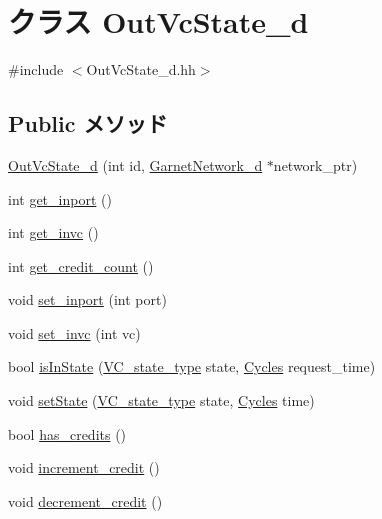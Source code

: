 \hypertarget{classOutVcState__d}{
\section{クラス OutVcState\_\-d}
\label{classOutVcState__d}
}


{\ttfamily \#include $<$OutVcState\_\-d.hh$>$}\subsection*{Public メソッド}
\begin{DoxyCompactItemize}
\item 
\hyperlink{classOutVcState__d_ad33dd53fd18c50a60742ba79d00c0aa3}{OutVcState\_\-d} (int id, \hyperlink{classGarnetNetwork__d}{GarnetNetwork\_\-d} $\ast$network\_\-ptr)
\item 
int \hyperlink{classOutVcState__d_aca4f0a0f6de31068eeef5a6a9ac277e1}{get\_\-inport} ()
\item 
int \hyperlink{classOutVcState__d_a37edb28b7e396bbc7599b01bc7a1fbbd}{get\_\-invc} ()
\item 
int \hyperlink{classOutVcState__d_a7887491ea82ae294ea3047f854f44490}{get\_\-credit\_\-count} ()
\item 
void \hyperlink{classOutVcState__d_ae97206c3cb5b279e0450ec99e6621fb6}{set\_\-inport} (int port)
\item 
void \hyperlink{classOutVcState__d_af2d22add988a75ebb297580c3e1d8df2}{set\_\-invc} (int vc)
\item 
bool \hyperlink{classOutVcState__d_ac76622b1411a4bb60ccc5ed355bc9645}{isInState} (\hyperlink{NetworkHeader_8hh_aaafaa208359111dcd9f4d47ff377da76}{VC\_\-state\_\-type} state, \hyperlink{classCycles}{Cycles} request\_\-time)
\item 
void \hyperlink{classOutVcState__d_a4ac4ce58e7eac1aee69c9891552538ec}{setState} (\hyperlink{NetworkHeader_8hh_aaafaa208359111dcd9f4d47ff377da76}{VC\_\-state\_\-type} state, \hyperlink{classCycles}{Cycles} time)
\item 
bool \hyperlink{classOutVcState__d_a67a31e9d15b406c89bd971df2e57e91d}{has\_\-credits} ()
\item 
void \hyperlink{classOutVcState__d_a172163c0eb1a059fb22ead59c4e29d86}{increment\_\-credit} ()
\item 
void \hyperlink{classOutVcState__d_a5b4a6d7df76dbdbffeb4228b7ed228c6}{decrement\_\-credit} ()
\end{DoxyCompactItemize}
